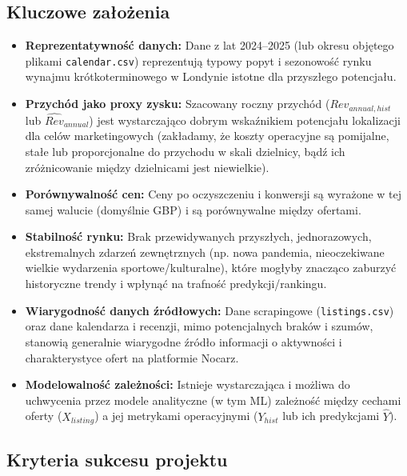 \documentclass[a4paper,11pt]{article}
\begin{document}
\subsection{Kluczowe założenia}
\begin{tcolorbox}[colback=yellow!5!white,colframe=yellow!50!black,title=Założenia projektu]
\begin{itemize}[label=$\bullet$,itemsep=5pt]
  \item \textbf{Reprezentatywność danych:} Dane z lat 2024–2025 (lub okresu objętego plikami \texttt{calendar.csv}) reprezentują typowy popyt i sezonowość rynku wynajmu krótkoterminowego w Londynie istotne dla przyszłego potencjału.
  \item \textbf{Przychód jako proxy zysku:} Szacowany roczny przychód ($Rev_{annual, hist}$ lub $\widehat{Rev}_{annual}$) jest wystarczająco dobrym wskaźnikiem potencjału lokalizacji dla celów marketingowych (zakładamy, że koszty operacyjne są pomijalne, stałe lub proporcjonalne do przychodu w skali dzielnicy, bądź ich zróżnicowanie między dzielnicami jest niewielkie).
  \item \textbf{Porównywalność cen:} Ceny po oczyszczeniu i konwersji są wyrażone w tej samej walucie (domyślnie GBP) i są porównywalne między ofertami.
  \item \textbf{Stabilność rynku:} Brak przewidywanych przyszłych, jednorazowych, ekstremalnych zdarzeń zewnętrznych (np. nowa pandemia, nieoczekiwane wielkie wydarzenia sportowe/kulturalne), które mogłyby znacząco zaburzyć historyczne trendy i wpłynąć na trafność predykcji/rankingu.
  \item \textbf{Wiarygodność danych źródłowych:} Dane scrapingowe (\texttt{listings.csv}) oraz dane kalendarza i recenzji, mimo potencjalnych braków i szumów, stanowią generalnie wiarygodne źródło informacji o aktywności i charakterystyce ofert na platformie Nocarz.
  \item \textbf{Modelowalność zależności:} Istnieje wystarczająca i możliwa do uchwycenia przez modele analityczne (w tym ML) zależność między cechami oferty ($X_{listing}$) a jej metrykami operacyjnymi ($Y_{hist}$ lub ich predykcjami $\widehat{Y}$).
\end{itemize}
\end{tcolorbox}

\vspace{0.5cm}

\subsection{Kryteria sukcesu projektu}
\end{document}
